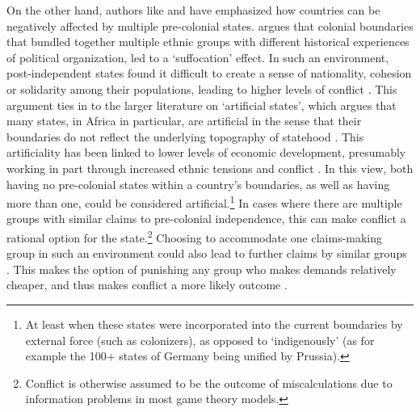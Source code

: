 \documentclass[12pt]{article}
\begin{document}
On the other hand, authors like \citet{Englebert2002} and \citet{Alesina2011}
have emphasized how countries can be negatively affected by multiple
pre-colonial states. \citet{Englebert2002} argues that colonial boundaries that
bundled together multiple ethnic groups with different historical experiences of
political organization, led to a `suffocation' effect. In such an environment,
post-independent states found it difficult to create a sense of nationality,
cohesion or solidarity among their populations, leading to higher levels of
conflict \citep{Englebert2002}. This argument ties in to the larger literature
on `artificial states', which argues that many states, in Africa in particular,
are artificial in the sense that their boundaries do not reflect the underlying
topography of statehood \citep{Alesina2011, Clapham1996, Jackson1991}. This
artificiality has been linked to lower levels of economic development,
presumably working in part through increased ethnic tensions and conflict
\citep{Alesina2011}. In this view, both having no pre-colonial states within a
country's boundaries, as well as having more than one, could be considered
artificial.\footnote{At least when these states were incorporated into the
current boundaries by external force (such as colonizers), as opposed to
`indigenously' (as for example the 100+ states of Germany being unified by
Prussia).} In cases where there are multiple groups with similar claims to
pre-colonial independence, this can make conflict a rational option for the
state.\footnote{Conflict is otherwise assumed to be the outcome of
miscalculations due to information problems in most game theory models.}
Choosing to accommodate one claims-making group in such an environment could
also lead to further claims by similar groups \citep{Walter2009}. This makes the
option of punishing any group who makes demands relatively cheaper, and thus
makes conflict a more likely outcome \citep{Wishman}.
\end{document}
